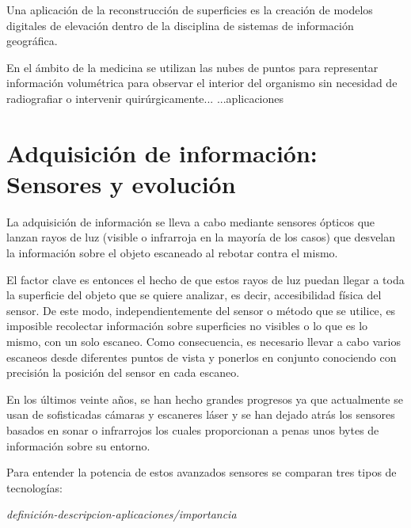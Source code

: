 Una aplicación de la reconstrucción de superficies es la creación de modelos digitales de elevación dentro de la disciplina de sistemas de información geográfica.

En el ámbito de la medicina se utilizan las nubes de puntos para representar información volumétrica para
observar el interior del organismo sin necesidad de radiografiar o intervenir quirúrgicamente...
...aplicaciones







\section{Adquisición de información: Sensores y evolución}

La adquisición de información se lleva a cabo mediante sensores ópticos que lanzan rayos de luz (visible
o infrarroja en la mayoría de los casos) que desvelan la información sobre el objeto escaneado al rebotar
contra el mismo.

El factor clave es entonces el hecho de que estos rayos de luz puedan llegar a toda la superficie del objeto
que se quiere analizar, es decir, accesibilidad física del sensor.
De este modo, independientemente del sensor o método que se utilice, es imposible recolectar
información sobre superficies no visibles o lo que es lo mismo, con un solo escaneo.
Como consecuencia, es necesario llevar a cabo varios escaneos desde diferentes puntos de vista y
ponerlos en conjunto conociendo con precisión la posición del sensor en cada escaneo.

En los últimos veinte años, se han hecho grandes progresos ya que actualmente se usan de sofisticadas cámaras y escaneres láser y se han dejado atrás los sensores basados en sonar o infrarrojos los cuales proporcionan a penas unos bytes de información sobre su entorno.

Para entender la potencia de estos avanzados sensores se comparan tres tipos de tecnologías: 

\textit{definición-descripcion-aplicaciones/importancia}

